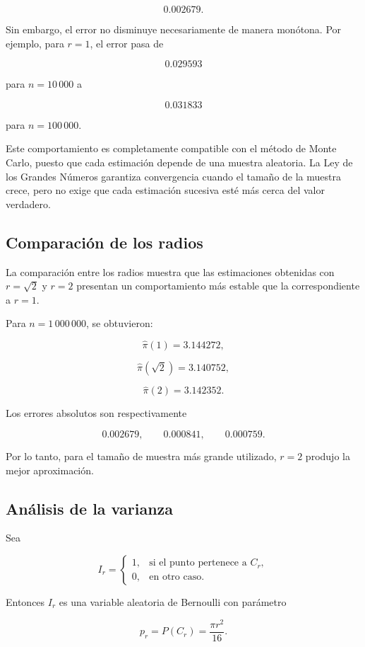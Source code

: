 \documentclass[12pt,a4paper]{article}
\begin{document}
\[
0.002679.
\]

Sin embargo, el error no disminuye necesariamente de manera monótona.
Por ejemplo, para \(r=1\), el error pasa de

\[
0.029593
\]

para \(n=10\,000\) a

\[
0.031833
\]

para \(n=100\,000\).

Este comportamiento es completamente compatible con el método de
Monte Carlo, puesto que cada estimación depende de una muestra
aleatoria. La Ley de los Grandes Números garantiza convergencia cuando
el tamaño de la muestra crece, pero no exige que cada estimación
sucesiva esté más cerca del valor verdadero.

\subsection{Comparación de los radios}

La comparación entre los radios muestra que las estimaciones obtenidas
con \(r=\sqrt{2}\) y \(r=2\) presentan un comportamiento más estable
que la correspondiente a \(r=1\).

Para \(n=1\,000\,000\), se obtuvieron:

\[
\widehat{\pi}(1)=3.144272,
\]

\[
\widehat{\pi}(\sqrt{2})=3.140752,
\]

\[
\widehat{\pi}(2)=3.142352.
\]

Los errores absolutos son respectivamente

\[
0.002679,\qquad
0.000841,\qquad
0.000759.
\]

Por lo tanto, para el tamaño de muestra más grande utilizado,
\(r=2\) produjo la mejor aproximación.

\subsection{Análisis de la varianza}

Sea

\[
I_r=
\begin{cases}
1, & \text{si el punto pertenece a }C_r,\\
0, & \text{en otro caso}.
\end{cases}
\]

Entonces \(I_r\) es una variable aleatoria de Bernoulli con parámetro

\[
p_r=P(C_r)=\frac{\pi r^2}{16}.
\]
\end{document}
